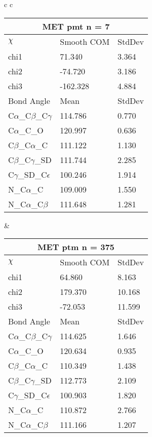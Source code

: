 \begin{longtable}{ c c }

  \begin{tabular}{ l l l }
  \toprule
  \multicolumn{3}{c}{MET \textbf{pmt} n = 7} \\ \toprule
  $\chi$       & Smooth COM & StdDev \\ \midrule
  chi1 & 71.340 & 3.364 \\ 
  chi2 & -74.720 & 3.186 \\ 
  chi3 & -162.328 & 4.884 \\ \midrule
  Bond Angle   & Mean     & StdDev \\ \midrule
  C$\alpha$\_C$\beta$\_C$\gamma$ & 114.786 & 0.770\\
  C$\alpha$\_C\_O & 120.997 & 0.636\\
  C$\beta$\_C$\alpha$\_C & 111.122 & 1.130\\
  C$\beta$\_C$\gamma$\_SD & 111.744 & 2.285\\
  C$\gamma$\_SD\_C$\epsilon$ & 100.246 & 1.914\\
  N\_C$\alpha$\_C & 109.009 & 1.550\\
  N\_C$\alpha$\_C$\beta$ & 111.648 & 1.281\\
  \bottomrule
  \end{tabular}
  &
  \begin{tabular}{ l l l }
  \toprule
  \multicolumn{3}{c}{MET \textbf{ptm} n = 375} \\ \toprule
  $\chi$       & Smooth COM & StdDev \\ \midrule
  chi1 & 64.860 & 8.163 \\ 
  chi2 & 179.370 & 10.168 \\ 
  chi3 & -72.053 & 11.599 \\ \midrule
  Bond Angle   & Mean     & StdDev \\ \midrule
  C$\alpha$\_C$\beta$\_C$\gamma$ & 114.625 & 1.646\\
  C$\alpha$\_C\_O & 120.634 & 0.935\\
  C$\beta$\_C$\alpha$\_C & 110.349 & 1.438\\
  C$\beta$\_C$\gamma$\_SD & 112.773 & 2.109\\
  C$\gamma$\_SD\_C$\epsilon$ & 100.903 & 1.820\\
  N\_C$\alpha$\_C & 110.872 & 2.766\\
  N\_C$\alpha$\_C$\beta$ & 111.166 & 1.207\\
  \bottomrule
  \end{tabular}
  \\

\end{longtable}
